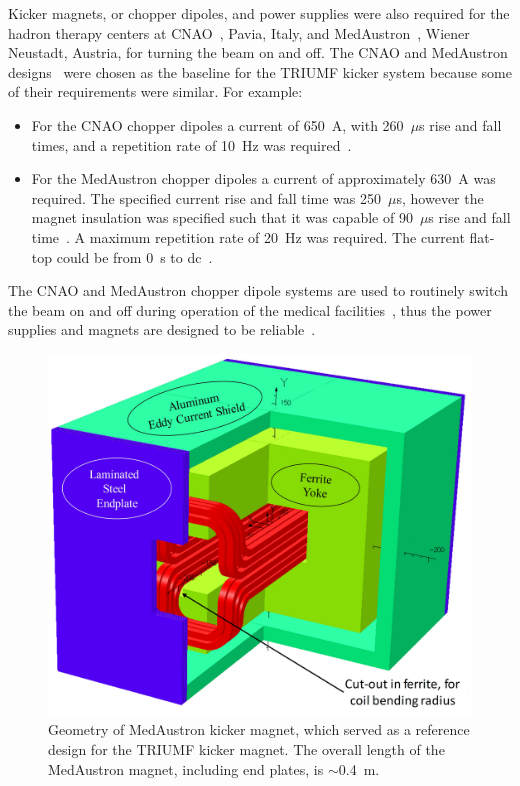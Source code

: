 \documentclass[aps,prab,twocolumn,superscriptaddress]{revtex4-1}
\begin{document}
Kicker magnets, or chopper dipoles, and power supplies were also required for the 
hadron therapy centers at CNAO~\cite{CNAO:Pullia2005}, Pavia, Italy, and
MedAustron~\cite{medaustron:Benedikt2005,medaustron:Benedikt2010}, Wiener Neustadt, Austria, for turning the beam on and off. The CNAO and MedAustron designs~\cite{Sermeus2004,Dallago2006,Borburgh2010} were chosen as the
baseline for the TRIUMF kicker system because some of their requirements were similar. For example:
\begin{itemize}[leftmargin=*]
\item For the CNAO chopper dipoles a current of 650~A, with
  260~$\mu$s rise and fall times, and a repetition rate of 10~Hz was
  required~\cite{Dallago2006}.
\item For the MedAustron chopper dipoles a current of approximately
  630~A was required. The specified current rise and fall time was
  250~$\mu$s, however the magnet insulation was specified such that it
  was capable of 90~$\mu$s rise and fall time~\cite{Borburgh2010}. A
  maximum repetition rate of 20~Hz was required.  The current flat-top
  could be from 0~s to dc~\cite{Stadlbauer2015}.
\end{itemize}

The CNAO and MedAustron chopper dipole systems are used to routinely
switch the beam on and off during operation of the medical
facilities~\cite{Bryant2000}, thus the power supplies and magnets are
designed to be reliable~\cite{Kramer2011}.

\begin{figure}[t]
  \includegraphics[width=\linewidth]{MedAustron-Magnet.jpg}
  \caption{Geometry of MedAustron kicker magnet, which served as a reference design for the TRIUMF kicker magnet. The overall length of the MedAustron magnet, including end plates, is $\sim$0.4~m.}
  \label{fig:medaustron}
\end{figure}
\end{document}
